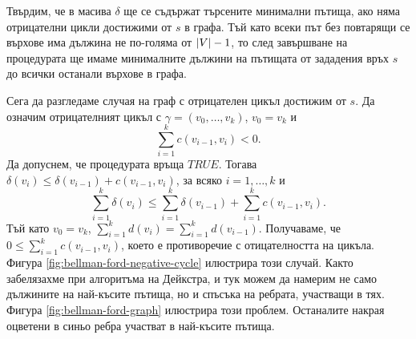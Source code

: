 Твърдим, че в масива $\delta$ ще се съдържат търсените минимални пътища, ако няма отрицателни цикли достижими от $s$ в графа.
Тъй като всеки път без повтарящи се върхове има дължина не по-голяма от $\vert{V}\vert - 1$, то след завършване на процедурата ще имаме минималните 
дължини на пътищата от зададения връх $s$ до всички останали върхове в графа.

Сега да разгледаме случая на граф с отрицателен цикъл достижим от $s$.
Да означим отрицателният цикъл с $\gamma = (v_0,\dots,v_k)$, $v_0 = v_k$ и
\[\sum^{k}_{i=1}c(v_{i-1},v_i) < 0.\]
Да допуснем, че процедурата връща $TRUE$. Тогава $\delta(v_i) \leq \delta(v_{i-1}) + c(v_{i-1},v_i)$, за всяко $i=1,\dots,k$ и
\[\sum^{k}_{i=1} \delta(v_i) \leq \sum^{k}_{i=1}\delta(v_{i-1}) + \sum^{k}_{i=1}c(v_{i-1},v_i).\]
Тъй като $v_0 = v_k$, $\sum^{k}_{i=1} d(v_i) = \sum^{k}_{i=1}d(v_{i-1})$.
Получаваме, че $0 \leq \sum^{k}_{i=1}c(v_{i-1},v_i)$, което е противоречие с отицателността на цикъла.
Фигура \ref{fig:bellman-ford-negative-cycle} илюстрира този случай.
Както забелязахме при алгоритъма на Дейкстра, и тук можем да намерим не само дължините на най-късите пътища, но
и спъсъка на ребрата, участващи в тях. Фигура \ref{fig:bellman-ford-graph} илюстрира този проблем. 
Останалите накрая оцветени в синьо ребра участват в най-късите пътища.



